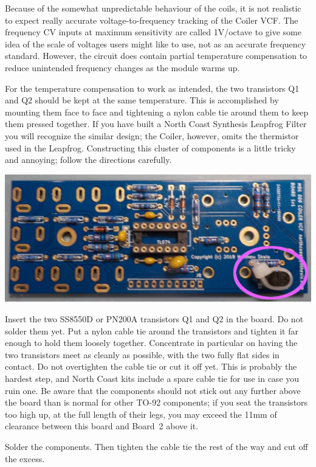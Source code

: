 Because of the somewhat unpredictable behaviour of the coils, it is not
realistic to expect really accurate voltage-to-frequency tracking of the
Coiler VCF.  The frequency CV inputs at maximum sensitivity are called
1V/octave to give some idea of the scale of voltages users might like to
use, not as an accurate frequency standard.  However, the circuit does
contain partial temperature compensation to reduce unintended frequency
changes as the module warms up.

For the temperature compensation to work as intended, the two transistors Q1
and Q2 should be kept at the same temperature.  This is accomplished by
mounting them face to face and tightening a nylon cable tie around them to
keep them pressed together.  If you have built a North Coast Synthesis
Leapfrog Filter you will recognize the similar design; the Coiler, however,
omits the thermistor used in the Leapfrog.  Constructing this cluster of
components is a little tricky and annoying; follow the directions carefully.

\nopagebreak
\noindent\includegraphics[width=\linewidth]{expocon1.jpg}

Insert the two SS8550D or PN200A transistors Q1 and Q2 in the board.  Do
not solder them yet.  Put a nylon cable tie around the transistors and
tighten it far enough to hold them loosely together.  Concentrate in
particular on having the two transistors meet as cleanly as possible, with
the two fully flat sides in contact.  Do not overtighten the cable tie or
cut it off yet.  This is probably the hardest step, and North Coast kits
include a spare cable tie for use in case you ruin one.  Be aware that the
components should not stick out any further above the board than is normal
for other TO-92 components; if you seat the transistors too high up, at the
full length of their legs, you may exceed the 11mm of clearance between this
board and Board~2 above it.

\pagebreak

Solder the components.  Then tighten the cable tie the rest of the way and
cut off the excess.

